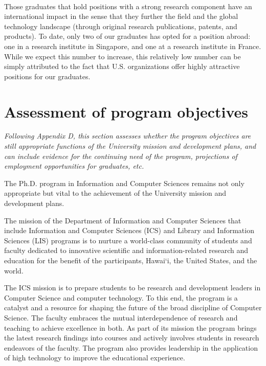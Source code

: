 \documentclass[12pt]{article}
\begin{document}
~\\
 Those graduates that
hold positions with a strong research component have an international
impact in the sense that they further the field and the global technology
landscape (through original research publications, patents, and
products). To date, only two of our graduates has opted for a position
abroad: one in a research institute in Singapore, and one at a research
institute in France. While we expect this number to increase, this
relatively low number can be simply attributed to the fact that
U.S. organizations offer highly attractive positions for our graduates.



\section{Assessment of program objectives}

{\em Following Appendix D, this section assesses whether the program
  objectives are still appropriate functions of the University mission and
  development plans, and can include evidence for the continuing need of
  the program, projections of employment opportunities for graduates, etc.}

The Ph.D. program in Information and Computer
Sciences remains not only appropriate but vital to the achievement of the
University mission and development plans.

The mission of the Department of Information and Computer Sciences that
include Information and Computer Sciences (ICS) and Library and Information
Sciences (LIS) programs is to nurture a world-class community of students
and faculty dedicated to innovative scientific and information-related
research and education for the benefit of the participants, Hawai`i, the
United States, and the world. 

The ICS mission is to prepare students to be research and development
leaders in Computer Science and computer technology. To this end, the
program is a catalyst and a resource for shaping the future of the broad
discipline of Computer Science. The faculty embraces the mutual
interdependence of research and teaching to achieve excellence in both. As
part of its mission the program brings the latest research findings into
courses and actively involves students in research endeavors of the
faculty. The program also provides leadership in the application of high
technology to improve the educational experience.
\end{document}

